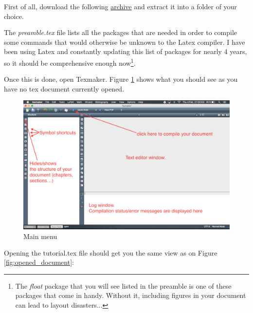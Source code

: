 \documentclass{report}
\begin{document}
First of all, download the following \href{https://drive.google.com/file/d/0Bzf79yzZcPJJNVhKNFBxWGs1aEE/view?usp=sharing}{archive} and extract it into a folder of your choice.

The \textit{preamble.tex} file lists all the packages that are needed in order to compile some commands that would otherwise be unknown to the Latex compiler. I have been using Latex and constantly updating this list of packages for nearly 4 years, so it should be comprehensive enough now\footnote{The \textit{float} package that you will see listed in the preamble is one of these packages that come in handy. Without it, including figures in your document can lead to layout disasters... }.

Once this is done, open Texmaker. Figure \ref{fig:texmaker_menu} shows what you should see as you have no tex document currently opened.

\begin{figure}[H]
\centering
\includegraphics[scale=0.38]{texmaker_menu}
\caption{Main menu}
\label{fig:texmaker_menu}
\end{figure}

Opening the tutorial.tex file should get you the same view as on Figure \ref{fig:opened_document}:
\end{document}
